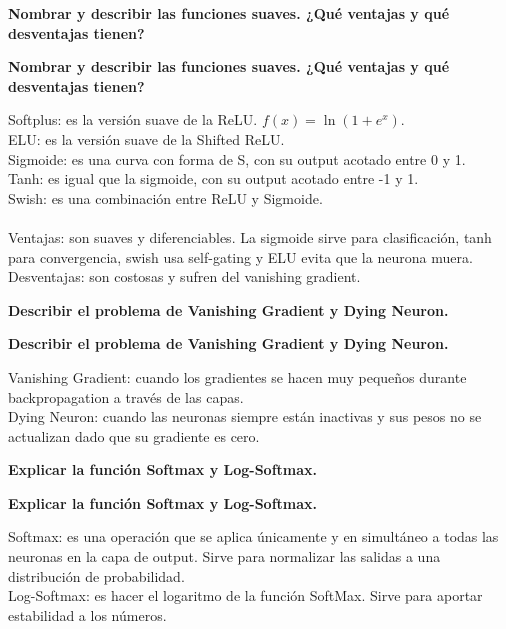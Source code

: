 \documentclass[10pt]{memoir}
\begin{document}
    \clearpage
    \begin{center}
        \textbf{\Large Nombrar y describir las funciones suaves. ¿Qué ventajas y qué desventajas tienen?}
    \end{center}

    \clearpage
    \begin{center}
        \textbf{\Large Nombrar y describir las funciones suaves. ¿Qué ventajas y qué desventajas tienen?} \\
    \end{center}
    Softplus: es la versión suave de la ReLU. \(f(x) = \ln(1+e^{x})\). \\
    ELU: es la versión suave de la Shifted ReLU. \\
    Sigmoide: es una curva con forma de S, con su output acotado entre 0 y 1. \\
    Tanh: es igual que la sigmoide, con su output acotado entre -1 y 1. \\
    Swish: es una combinación entre ReLU y Sigmoide. \\
    \\
    Ventajas: son suaves y diferenciables. La sigmoide sirve para clasificación, tanh para convergencia, swish usa self-gating y ELU evita que la neurona muera. \\
    Desventajas: son costosas y sufren del vanishing gradient.
  
    \clearpage
    \begin{center}
        \textbf{\Large Describir el problema de Vanishing Gradient y Dying Neuron.}
    \end{center}

    \clearpage
    \begin{center}
        \textbf{\Large Describir el problema de Vanishing Gradient y Dying Neuron.}
    \end{center}
    Vanishing Gradient: cuando los gradientes se hacen muy pequeños durante backpropagation a través de las capas. \\
    Dying Neuron: cuando las neuronas siempre están inactivas y sus pesos no se actualizan dado que su gradiente es cero.

    \clearpage
    \begin{center}
        \textbf{\Large Explicar la función Softmax y Log-Softmax.}
    \end{center}

    \clearpage
    \begin{center}
        \textbf{\Large Explicar la función Softmax y Log-Softmax.}
    \end{center}
    Softmax: es una operación que se aplica únicamente y en simultáneo a todas las neuronas en la capa de output. Sirve para normalizar las salidas a una distribución de probabilidad. \\
    Log-Softmax: es hacer el logaritmo de la función SoftMax. Sirve para aportar estabilidad a los números.
\end{document}
